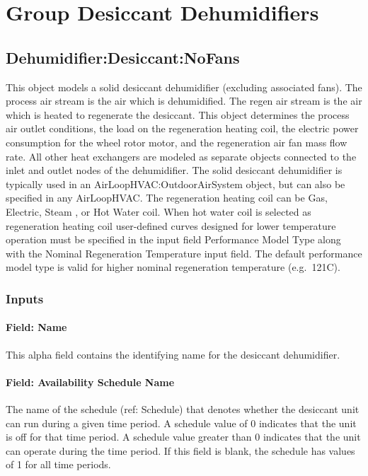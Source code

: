 \section{Group Desiccant Dehumidifiers}\label{group-desiccant-dehumidifiers}

\subsection{Dehumidifier:Desiccant:NoFans}\label{dehumidifierdesiccantnofans}

This object models a solid desiccant dehumidifier (excluding associated fans). The process air stream is the air which is dehumidified. The regen air stream is the air which is heated to regenerate the desiccant. This object determines the process air outlet conditions, the load on the regeneration heating coil, the electric power consumption for the wheel rotor motor, and the regeneration air fan mass flow rate. All other heat exchangers are modeled as separate objects connected to the inlet and outlet nodes of the dehumidifier. The solid desiccant dehumidifier is typically used in an AirLoopHVAC:OutdoorAirSystem object, but can also be specified in any AirLoopHVAC. The regeneration heating coil can be Gas, Electric, Steam , or Hot Water coil. When hot water coil is selected as regeneration heating coil user-defined curves designed for lower temperature operation must be specified in the input field Performance Model Type along with the Nominal Regeneration Temperature input field. The default performance model type is valid for higher nominal regeneration temperature (e.g.~121C).

\subsubsection{Inputs}\label{inputs-011}

\paragraph{Field: Name}\label{field-name-010}

This alpha field contains the identifying name for the desiccant dehumidifier.

\paragraph{Field: Availability Schedule Name}\label{field-availability-schedule-name-004}

The name of the schedule (ref: Schedule) that denotes whether the desiccant unit can run during a given time period. A schedule value of 0 indicates that the unit is off for that time period. A schedule value greater than 0 indicates that the unit can operate during the time period. If this field is blank, the schedule has values of 1 for all time periods.

